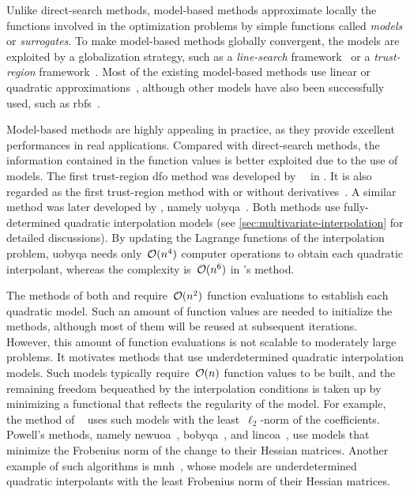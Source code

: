 Unlike direct-search methods, model-based methods approximate locally the functions involved in the optimization problems by simple functions called \emph{models} or \emph{surrogates}.
To make model-based methods globally convergent, the models are exploited by a globalization strategy, such as a \emph{line-search} framework~\cite[ch.~3]{Nocedal_Wright_2006} or a \emph{trust-region} framework~\cite{Conn_Gould_Toint_2000,Yuan_2015}.
Most of the existing model-based methods use linear or quadratic approximations~\cite{Powell_1994,Conn_Scheinberg_Vicente_2008a,Conn_Scheinberg_Vicente_2008b}, although other models have also been successfully used, such as \glspl{rbf}~\cite{Oeuvray_2005}.

Model-based methods are highly appealing in practice, as they provide excellent performances in real applications.
Compared with direct-search methods, the information contained in the function values is better exploited due to the use of models.
The first trust-region \gls{dfo} method was developed by~\citeauthor{Winfield_1969}~\cite{Winfield_1969,Winfield_1973} in \citeyear{Winfield_1969}.
It is also regarded as the first trust-region method with or without derivatives~\cite[\S~1.2]{Conn_Gould_Toint_2000}.
A similar method was later developed by \citeauthor{Powell_2002}, namely \gls{uobyqa}~\cite{Powell_2002}.
Both methods use fully-determined quadratic interpolation models (see \cref{sec:multivariate-interpolation} for detailed discussions).
By updating the Lagrange functions of the interpolation problem, \gls{uobyqa} needs only~$\operatorname{\mathcal{O}}(n^4)$ computer operations to obtain each quadratic interpolant, whereas the complexity is~$\operatorname{\mathcal{O}}(n^6)$ in \citeauthor{Winfield_1969}'s method.

The methods of both \citeauthor{Winfield_1969} and \citeauthor{Powell_2002} require~$\operatorname{\mathcal{O}}(n^2)$ function evaluations to establish each quadratic model.
Such an amount of function values are needed to initialize the methods, although most of them will be reused at subsequent iterations.
However, this amount of function evaluations is not scalable to moderately large problems.
It motivates methods that use underdetermined quadratic interpolation models.
Such models typically require~$\operatorname{\mathcal{O}}(n)$ function values to be built, and the remaining freedom bequeathed by the interpolation conditions is taken up by minimizing a functional that reflects the regularity of the model.
For example, the method of \citeauthor{Conn_Toint_1996}~\cite{Conn_Toint_1996} uses such models with the least~$\ell_2$-norm of the coefficients.
Powell's methods, namely \gls{newuoa}~\cite{Powell_2006}, \gls{bobyqa}~\cite{Powell_2009}, and \gls{lincoa}~\cite{Powell_2015}, use models that minimize the Frobenius norm of the change to their Hessian matrices.
Another example of such algorithms is \gls{mnh}~\cite{Wild_2008}, whose models are underdetermined quadratic interpolants with the least Frobenius norm of their Hessian matrices.

